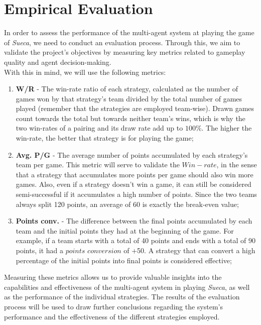\documentclass[sigconf]{acmart}
\begin{document}
\section{Empirical Evaluation}

In order to assess the performance of the multi-agent system at playing the game of \textit{Sueca}, we need to conduct an evaluation process. Through this, we aim to validate the project's objectives by measuring key metrics related to gameplay quality and agent decision-making.\\
With this in mind, we will use the following metrics:\\

\begin{enumerate}[label=\textbf{\arabic*}]
  \item \textbf{W/R} - The win-rate ratio of each strategy, calculated as the number of games won by that strategy's team divided by the total number of games played (remember that the strategies are employed team-wise). Drawn games count towards the total but towards neither team's wins, which is why the two win-rates of a pairing and its draw rate add up to $100\%$. The higher the win-rate, the better that strategy is for playing the game;\\

  \item \textbf{Avg. P/G} - The average number of points accumulated by each strategy's team per game. This metric will serve to validate the $Win-rate$, in the sense that a strategy that accumulates more points per game should also win more games. Also, even if a strategy doesn't win a game, it can still be considered semi-successful if it accumulates a high number of points. Since the two teams always split 120 points, an average of $60$ is exactly the break-even value;\\

  \item \textbf{Points conv.} - The difference between the final points accumulated by each team and the initial points they had at the beginning of the game. For example, if a team starts with a total of 40 points and ends with a total of 90 points, it had a $points$ $conversion$ of +50. A strategy that can convert a high percentage of the initial points into final points is considered effective;\\
\end{enumerate}

\noindent Measuring these metrics allows us to provide valuable insights into the capabilities and effectiveness of the multi-agent system in playing \textit{Sueca}, as well as the performance of the individual strategies. The results of the evaluation process will be used to draw further conclusions regarding the system's performance and the effectiveness of the different strategies employed.
\end{document}
